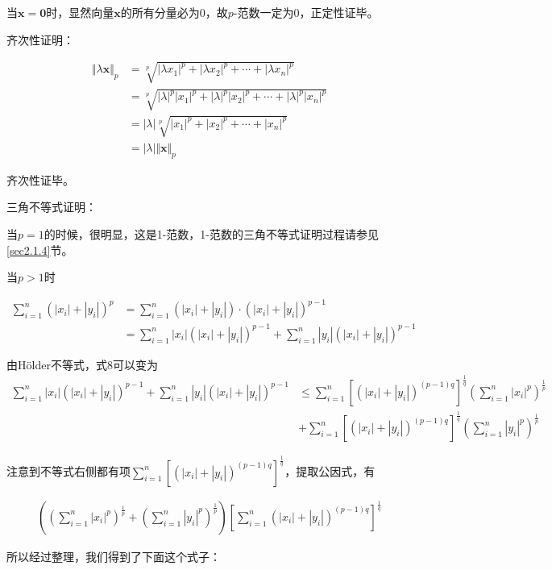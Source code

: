 \documentclass[12pt, a4paper, oneside, UTF8]{ctexbook}
\begin{document}
当$\boldsymbol{x=0}$时，显然向量$\boldsymbol{x}$的所有分量必为0，故$p$-范数一定为0，正定性证毕。

\noindent
齐次性证明：

\[
\begin{aligned}
    \Vert \lambda \boldsymbol{x}\Vert_p&=\sqrt[p]{|\lambda x_1|^p+|\lambda x_2|^p+\cdots+|\lambda x_n|^p}\\
    &=\sqrt[p]{|\lambda|^p|x_1|^p+|\lambda|^p|x_2|^p+\cdots+|\lambda|^p|x_n|^p}\\
    &=|\lambda|\sqrt[p]{|x_1|^p+|x_2|^p+\cdots+|x_n|^p}\\
    &=|\lambda|\Vert \boldsymbol{x}\Vert_p
\end{aligned}
\]

齐次性证毕。

\noindent
三角不等式证明：

当$p=1$的时候，很明显，这是1-范数，1-范数的三角不等式证明过程请参见\ref{sec2.1.4}节。

当$p>1$时

\[
\begin{aligned}
    \sum\limits_{i=1}^n(|x_i|+|y_i|)^p&=\sum\limits_{i=1}^n(|x_i|+|y_i|)\cdot(|x_i|+|y_i|)^{p-1}\\
    &=\sum\limits_{i=1}^n|x_i|(|x_i|+|y_i|)^{p-1}+\sum\limits_{i=1}^n|y_i|(|x_i|+|y_i|)^{p-1}
\end{aligned}\tag{8}
\]

由Hölder不等式，式8可以变为
\[
\begin{aligned}
    \sum\limits_{i=1}^n|x_i|(|x_i|+|y_i|)^{p-1}+\sum\limits_{i=1}^n|y_i|(|x_i|+|y_i|)^{p-1}&\leq
    \sum\limits_{i=1}^n\left[(|x_i|+|y_i|)^{(p-1)q}\right]^{\frac{1}{q}}\left(\sum\limits_{i=1}^n|x_i|^p\right)^{\frac{1}{p}}\\&+\sum\limits_{i=1}^n\left[(|x_i|+|y_i|)^{(p-1)q}\right]^{\frac{1}{q}}\left(\sum\limits_{i=1}^n|y_i|^p\right)^{\frac{1}{p}}
\end{aligned}
\]

注意到不等式右侧都有项$\sum\limits_{i=1}^n\left[(|x_i|+|y_i|)^{(p-1)q}\right]^{\frac{1}{q}}$，提取公因式，有

\[
\begin{aligned}
    \left(\left(\sum\limits_{i=1}^n|x_i|^p\right)^{\frac{1}{p}}+\left(\sum\limits_{i=1}^n|y_i|^p\right)^{\frac{1}{p}}\right)\left[\sum\limits_{i=1}^n(|x_i|+|y_i|)^{(p-1)q}\right]^{\frac{1}{q}}
\end{aligned}
\]

所以经过整理，我们得到了下面这个式子：
\end{document}

